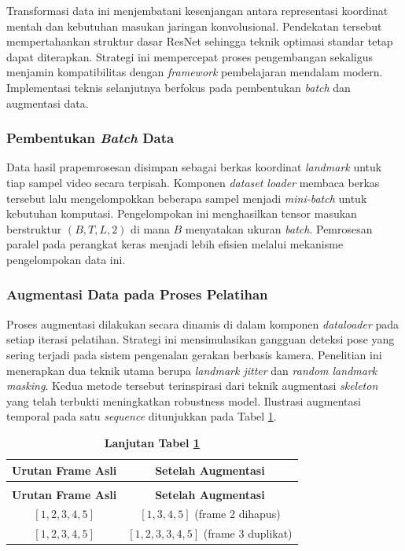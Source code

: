Transformasi data ini menjembatani kesenjangan antara representasi koordinat mentah dan kebutuhan masukan jaringan konvolusional.
Pendekatan tersebut mempertahankan struktur dasar ResNet sehingga teknik optimasi standar tetap dapat diterapkan.
Strategi ini mempercepat proses pengembangan sekaligus menjamin kompatibilitas dengan \textit{framework} pembelajaran mendalam modern.
Implementasi teknis selanjutnya berfokus pada pembentukan \textit{batch} dan augmentasi data.

\subsubsection{Pembentukan \textit{Batch} Data}
\label{subsubsec:pembentukan-batch}
Data hasil prapemrosesan disimpan sebagai berkas koordinat \textit{landmark} untuk tiap sampel video secara terpisah.
Komponen \textit{dataset loader} membaca berkas tersebut lalu mengelompokkan beberapa sampel menjadi \textit{mini-batch} untuk kebutuhan komputasi.
Pengelompokan ini menghasilkan tensor masukan berstruktur $(B, T, L, 2)$ di mana $B$ menyatakan ukuran \textit{batch}.
Pemrosesan paralel pada perangkat keras menjadi lebih efisien melalui mekanisme pengelompokan data ini.

\subsubsection{Augmentasi Data pada Proses Pelatihan}
\label{subsubsec:augmentasi-pelatihan}
Proses augmentasi dilakukan secara dinamis di dalam komponen \textit{dataloader} pada setiap iterasi pelatihan.
Strategi ini mensimulasikan gangguan deteksi pose yang sering terjadi pada sistem pengenalan gerakan berbasis kamera.
Penelitian ini menerapkan dua teknik utama berupa \textit{landmark jitter} dan \textit{random landmark masking}.
Kedua metode tersebut terinspirasi dari teknik augmentasi \textit{skeleton} yang telah terbukti meningkatkan robustness model.
Ilustrasi augmentasi temporal pada satu \textit{sequence} ditunjukkan pada Tabel \ref{tab:3-temporal-augmentation-example}.

\begin{longtable}{|c|c|}
\caption{Ilustrasi augmentasi temporal pada satu \textit{sequence}} \label{tab:3-temporal-augmentation-example} \\ \hline
\textbf{Urutan Frame Asli} & \textbf{Setelah Augmentasi} \\ \hline
\endfirsthead
\caption*{\textbf{Lanjutan Tabel \ref{tab:3-temporal-augmentation-example}}} \\ \hline
\textbf{Urutan Frame Asli} & \textbf{Setelah Augmentasi} \\ \hline
\endhead
\hline
\endfoot
$[1,2,3,4,5]$ & $[1,3,4,5]$ (frame 2 dihapus) \\ \hline
$[1,2,3,4,5]$ & $[1,2,3,3,4,5]$ (frame 3 duplikat) \\ \hline
\end{longtable}

